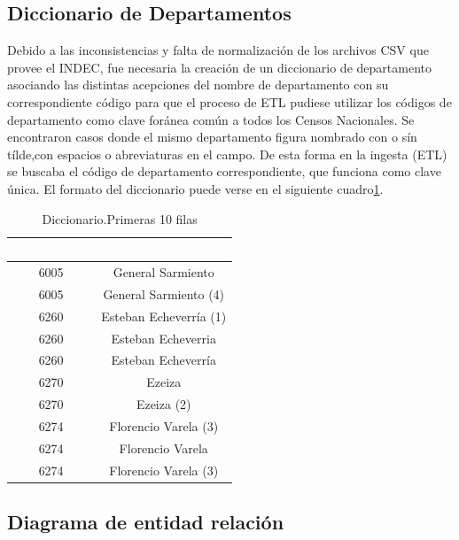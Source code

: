 \documentclass{article}
\theoremstyle{mytheoremstyle}
\theoremstyle{mytheoremstyle}
\theoremstyle{myproblemstyle}
\begin{document}
 \subsection{Diccionario de Departamentos } 
Debido a las inconsistencias y falta de normalización de los archivos CSV que provee el INDEC,
 fue necesaria la creación de un diccionario de departamento asociando las distintas acepciones del nombre de
  departamento con su correspondiente código para que el proceso de ETL pudiese utilizar los códigos de departamento 
  como clave foránea común a todos los Censos Nacionales.
  Se encontraron casos donde el mismo departamento figura nombrado con o sín  tílde,con espacios o abreviaturas en el campo. \newline
De esta forma en la ingesta (ETL) se buscaba el código de departamento correspondiente, que funciona como clave única.
 El formato del diccionario puede verse en el siguiente cuadro\ref{tab:diccionario}.
\begin{table}[htb]
  \centering
  \begin{tabular}{|c|c|}
  \hline
  \textbf{\cellcolor[rgb]{0,0.231,0.427}\textcolor{white}{CodigoDpto}} & \textbf{\cellcolor[rgb]{0,0.231,0.427}\textcolor{white}{Departamento}} \\ \hline
  6005 & General Sarmiento \\
  6005 & General Sarmiento (4) \\
  6260 & Esteban Echeverría (1) \\
  6260 & Esteban Echeverria \\
  6260 & Esteban Echeverría \\
  6270 & Ezeiza \\
  6270 & Ezeiza (2) \\
  6274 & Florencio Varela (3)  \\
  6274 & Florencio Varela \\
  6274 & Florencio Varela (3)  \\
  \hline
  \end{tabular}
  \caption{Diccionario.Primeras 10 filas}
  \label{tab:diccionario}
  \end{table}

 \subsection{Diagrama de entidad relación }
\end{document}
